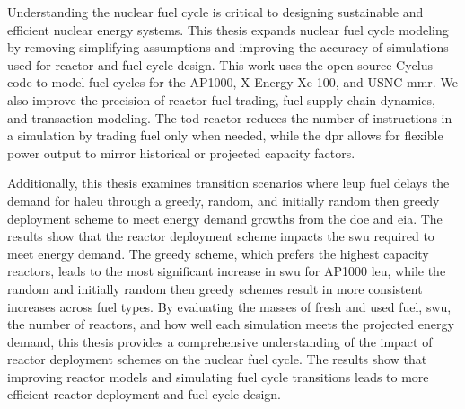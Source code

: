 

Understanding the nuclear fuel cycle is critical to designing sustainable and efficient nuclear energy systems. This thesis expands nuclear fuel cycle modeling by removing simplifying assumptions and improving the accuracy of simulations used for reactor and fuel cycle design. This work uses the open-source Cyclus code to model fuel cycles for the AP1000, X-Energy Xe-100, and USNC \gls{mmr}. We also improve the precision of reactor fuel trading, fuel supply chain dynamics, and transaction modeling. The \gls{tod} reactor reduces the number of instructions in a simulation by trading fuel only when needed, while the \gls{dpr} allows for flexible power output to mirror historical or projected capacity factors.

Additionally, this thesis examines transition scenarios where \gls{leup} fuel delays the demand for \gls{haleu} through a greedy, random, and initially random then greedy deployment scheme to meet energy demand growths from the \gls{doe} and \gls{eia}. The results show that the reactor deployment scheme impacts the \gls{swu} required to meet energy demand. The greedy scheme, which prefers the highest capacity reactors, leads to the most significant increase in \gls{swu} for AP1000 \gls{leu}, while the random and initially random then greedy schemes result in more consistent increases across fuel types. By evaluating the masses of fresh and used fuel, \gls{swu}, the number of reactors, and how well each simulation meets the projected energy demand, this thesis provides a comprehensive understanding of the impact of reactor deployment schemes on the nuclear fuel cycle. The results show that improving reactor models and simulating fuel cycle transitions leads to more efficient reactor deployment and fuel cycle design.



